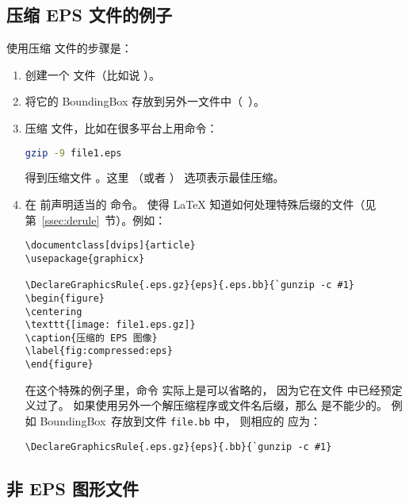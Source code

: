 \subsection{压缩 EPS 文件的例子}\label{ssec:compresseps}

使用压缩  文件的步骤是：
\begin{enumerate}
	\item 创建一个  文件（比如说 ）。
	\item 将它的 BoundingBox 存放到另外一文件中（~）。
	\item 压缩    文件，比如在很多平台上用命令：
	\begin{lstlisting}[language=bash]
	gzip -9 file1.eps
	\end{lstlisting}
	得到压缩文件 。这里 （或者 ） 选项表示最佳压缩。
	\item 在 前声明适当的  命令。
	使得 \LaTeX{} 知道如何处理特殊后缀的文件（见第~\ref{ssec:derule}~节）。例如：
\begin{lstlisting}
\documentclass[dvips]{article}
\usepackage{graphicx}

\DeclareGraphicsRule{.eps.gz}{eps}{.eps.bb}{`gunzip -c #1}
\begin{figure}
\centering
\texttt{[image: file1.eps.gz]}
\caption{压缩的 EPS 图像}
\label{fig:compressed:eps}
\end{figure}

\end{lstlisting}
	在这个特殊的例子里，命令  实际上是可以省略的，
	因为它在文件  中已经预定义过了。
	如果使用另外一个解压缩程序或文件名后缀，那么  是不能少的。
	例如 BoundingBox~存放到文件 \texttt{file.bb} 中，
	则相应的  应为：
\begin{lstlisting}
\DeclareGraphicsRule{.eps.gz}{eps}{.bb}{`gunzip -c #1}
\end{lstlisting}
\end{enumerate}


\subsection{非 EPS 图形文件}\label{ssec:noneps}

